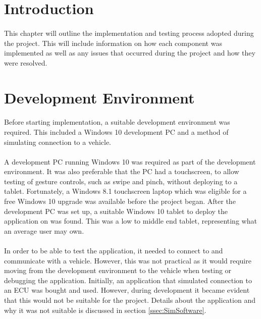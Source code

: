 \section{Introduction}
	\paragraph{}{
	This chapter will outline the implementation and testing process adopted during the project. This will include information on how each component was implemented as well as any issues that occurred during the project and how they were resolved.
	}
\section{Development Environment}{
	\paragraph{}{
	Before starting implementation, a suitable development environment was required. This included a Windows 10 development PC and a method of simulating connection to a vehicle. 
	}
	\paragraph{}{
	A development PC running Windows 10 was required as part of the development environment. It was also preferable that the PC had a touchscreen, to allow testing of gesture controls, such as swipe and pinch, without deploying to a tablet. Fortunately, a Windows 8.1 touchscreen laptop which was eligible for a free Windows 10 upgrade was available before the project began. After the development PC was set up, a suitable Windows 10 tablet to deploy the application on was found. This was a low to middle end tablet, representing what an average user may own.
	}
	
	\paragraph{}{
	In order to be able to test the application, it needed to connect to and communicate with a vehicle. However, this was not practical as it would require moving from the development environment to the vehicle when testing or debugging the application. Initially, an application that simulated connection to an ECU was bought and used. However, during development it became evident that this would not be suitable for the project. Details about the application and why it was not suitable is discussed in section \ref{ssec:SimSoftware}.
	}
	
}
